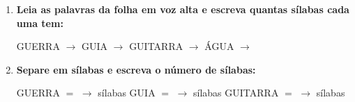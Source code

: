 \begin{exercicio}
\begin{enumerate}[resume]
  \item \textbf{Leia as palavras da folha em voz alta e escreva quantas sílabas cada uma tem:}

  \begin{center}
  GUERRA $\rightarrow$ \underline{\hspace{1cm}} \quad GUIA $\rightarrow$ \underline{\hspace{1cm}} \quad GUITARRA $\rightarrow$ \underline{\hspace{1cm}} \quad ÁGUA $\rightarrow$ \underline{\hspace{1cm}}
  \end{center}

  \item \textbf{Separe em sílabas e escreva o número de sílabas:}
  \begin{center}
  GUERRA $=$ \underline{\hspace{1.2cm}} $\rightarrow$ \underline{\hspace{0.8cm}} sílabas \quad GUIA $=$ \underline{\hspace{1.2cm}} $\rightarrow$ \underline{\hspace{0.8cm}} sílabas \quad GUITARRA $=$ \underline{\hspace{1.2cm}} $\rightarrow$ \underline{\hspace{0.8cm}} sílabas
  \end{center}

\end{enumerate}

\end{exercicio}



